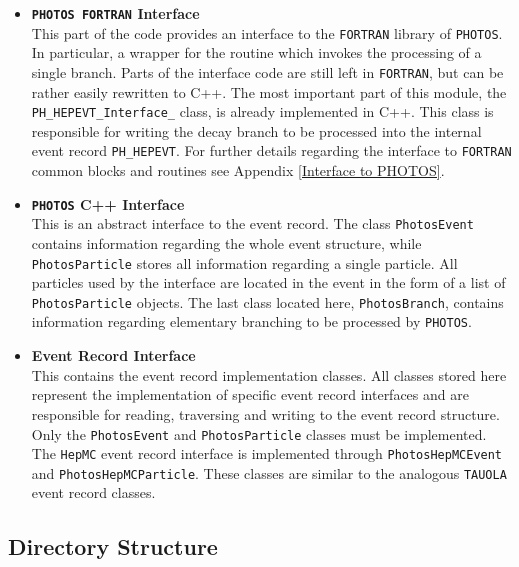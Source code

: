 \documentclass[]{Photos_interface_design}
\begin{document}
\begin{itemize}
  \item {\bf {\tt PHOTOS FORTRAN} Interface}\\
       This part of the code provides an interface 
       to the {\tt FORTRAN} library of {\tt PHOTOS}. In particular,
	   a wrapper for the routine which invokes the processing
	   of a single branch. Parts of the interface code are still left in {\tt FORTRAN}, but
	   can be rather easily rewritten to C++. 
       The most important part of this module, the {\tt PH\_HEPEVT\_Interface\_} class,
       is already implemented  in C++. This class is responsible for writing
	   the decay branch to be processed into the internal event record {\tt PH\_HEPEVT}.
       For further details regarding the interface to {\tt FORTRAN}
	   common blocks and routines see Appendix \ref{Interface to PHOTOS}.
  \item {\bf {\tt PHOTOS} C++ Interface} \\
       This is an abstract interface to the event record.
       The class {\tt PhotosEvent} contains information regarding the whole event
       structure, while {\tt PhotosParticle} stores all information regarding a single particle.
       All particles used by the interface are located in the event in the form of
       a list of {\tt PhotosParticle} objects.
       The last class located here, {\tt PhotosBranch}, contains information regarding
	 elementary branching to be processed by {\tt PHOTOS}.
  \item {\bf Event Record Interface} \\
       This contains the event record implementation classes. All classes stored here represent
       the implementation of specific event record interfaces and are responsible for reading,
       traversing and writing to the event record structure.
       Only the {\tt PhotosEvent} and {\tt PhotosParticle} classes must be implemented.
       The {\tt HepMC} event record interface is implemented
       through {\tt PhotosHepMCEvent} and {\tt PhotosHepMCParticle}. These classes are similar to the
       analogous {\tt TAUOLA} \cite{Davidson:2010rw} event record classes.
\end{itemize}

\subsection{Directory Structure}
\end{document}
